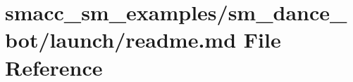 \hypertarget{smacc__sm__examples_2sm__dance__bot_2launch_2readme_8md}{}\section{smacc\+\_\+sm\+\_\+examples/sm\+\_\+dance\+\_\+bot/launch/readme.md File Reference}
\label{smacc__sm__examples_2sm__dance__bot_2launch_2readme_8md}
